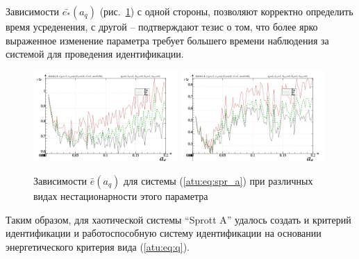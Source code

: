 Зависимости $\bar{e_*}(a_q)$ (рис.~\ref{atu:f:spr_a_e_a_q})
с одной стороны, позволяют корректно определить время усреденения,
с другой -- подтверждают тезис о том, что более ярко выраженное изменение
параметра требует большего времени наблюдения за системой
для проведения идентификации.

\begin{figure}[htb!]
\centerline{
  \includegraphics[width=0.49\textwidth]{p/cha/spr_a/sprott_a_m5p-p_a_q_e_sign.png}
  \includegraphics[width=0.49\textwidth]{p/cha/spr_a/sprott_a_m5p-p_a_q_e_sin.png}
}
  \caption{Зависимости  $\bar{e}(a_q)$ для системы (\ref{atu:eq:spr_a})
  при различных видах нестационарности этого параметра
}
\label{atu:f:spr_a_e_a_q}
\end{figure}

Таким образом, для хаотической системы ``Sprott A''
удалось создать и критерий идентификации и работоспособную систему идентификации
на основании энергетического критерия вида (\ref{atu:eq:q}).


